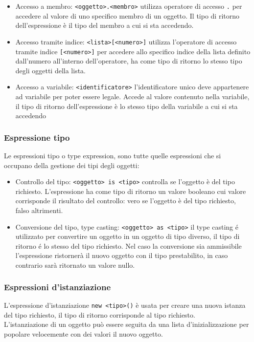 \begin{itemize}
    \item 
    {
        Accesso a membro: \verb|<oggetto>.<membro>| utilizza operatore di accesso \verb|.| per accedere
        al valore di uno specifico membro di un oggetto.
        Il tipo di ritorno dell'espressione è il tipo del membro a cui si sta accedendo.
    }
    \item 
    {
        Accesso tramite indice: \verb|<lista>[<numero>]| utilizza l'operatore di accesso tramite indice
        \verb|[<numero>]| per accedere allo specifico indice della lista definito dall'numero all'interno
        dell'operatore, ha come tipo di ritorno lo stesso tipo degli oggetti della lista.
    }
    \item 
    {
        Accesso a variabile: \verb|<identificatore>| l'identificatore unico deve appartenere ad variabile
        per poter essere legale. Accede al valore contenuto nella variabile, il tipo di ritorno dell'espressione
        è lo stesso tipo della variabile a cui si sta accedendo
    }
\end{itemize}

\subsubsection{Espressione tipo}
Le espressioni tipo o type expression, sono tutte quelle espressioni che si occupano della 
gestione dei tipi degli oggetti:
\begin{itemize}
    \item
    {
        Controllo del tipo: \verb|<oggetto> is <tipo>| controlla se l'oggetto è del tipo richiesto.
        L'espressione ha come tipo di ritorno un valore booleano cui valore corrisponde il risultato del controllo:
        vero se l'oggetto è del tipo richiesto, falso altrimenti.
    }
    \item 
    {
        Conversione del tipo, type casting: \verb|<oggetto> as <tipo>| il type casting é utilizzato
        per convertire un oggetto in un oggetto di tipo diverso, il tipo di ritorno é lo stesso del tipo richiesto.
        Nel caso la conversione sia ammissibile l'espressione ristornerà il nuovo oggetto con il tipo prestabilito,
        in caso contrario sarà ritornato un valore nullo.
    }
\end{itemize}

\subsubsection{Espressioni d'istanziazione}
L'espressione d'istanziazione \verb|new <tipo>()| è usata per creare una nuova istanza del tipo
richiesto, il tipo di ritorno corrisponde al tipo richiesto.
\\
L'istanziazione di un oggetto può essere seguita da una lista d'inizializzazione per popolare 
velocemente con dei valori il nuovo oggetto.

